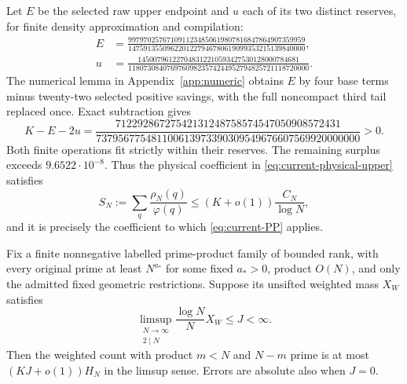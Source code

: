 Let $E$ be the selected raw upper endpoint and $u$ each of its two
distinct reserves, for finite density approximation and compilation:
\begin{align}
 E&=\frac{9979702576710911234850619807816847864907359959}
             {1475913550962201227946780619099353215139840000},
       \label{eq:current-E}\\
 u&=\frac{145007961227048312210593427530128000784681}
             {11807308407697609823574244952794825721118720000}.
       \label{eq:current-u}
\end{align}
The numerical lemma in Appendix~\ref{app:numeric} obtains $E$ by
four base terms minus twenty-two selected positive savings, with the
full noncompact third tail replaced once.  Exact subtraction gives
\begin{equation}
 K-E-2u=
 \frac{71229286727542131248758574547050908572431}
      {737956775481100613973390309549676607569920000000}>0.
 \label{eq:current-upper-slack}
\end{equation}
Both finite operations fit strictly within their reserves.  The
remaining surplus exceeds $9.6522\cdot10^{-8}$.  Thus the physical
coefficient in \eqref{eq:current-physical-upper} satisfies
\begin{equation}
 S_N:=\sum_q\frac{\rho_N(q)}{\varphi(q)}
       \le(K+o(1))\frac{C_N}{\log N},
 \label{eq:current-upper-density}
\end{equation}
and it is precisely the coefficient to which
\eqref{eq:current-PP} applies.

\begin{proposition}
\label{prop:current-positive-product}
Fix a finite nonnegative labelled prime-product family of bounded
rank, with every original prime at least $N^{a_*}$ for some fixed
$a_*>0$, product $O(N)$, and only the admitted fixed geometric
restrictions.  Suppose its unsifted weighted mass $X_W$ satisfies
\[
 \limsup_{\substack{N\to\infty\\2\mid N}}
             \frac{\log N}{N}X_W\le J<\infty.
\]
Then the weighted count with product $m<N$ and $N-m$ prime is at most
$(KJ+o(1))H_N$ in the limsup sense.  Errors are absolute also when
$J=0$.
\end{proposition}

